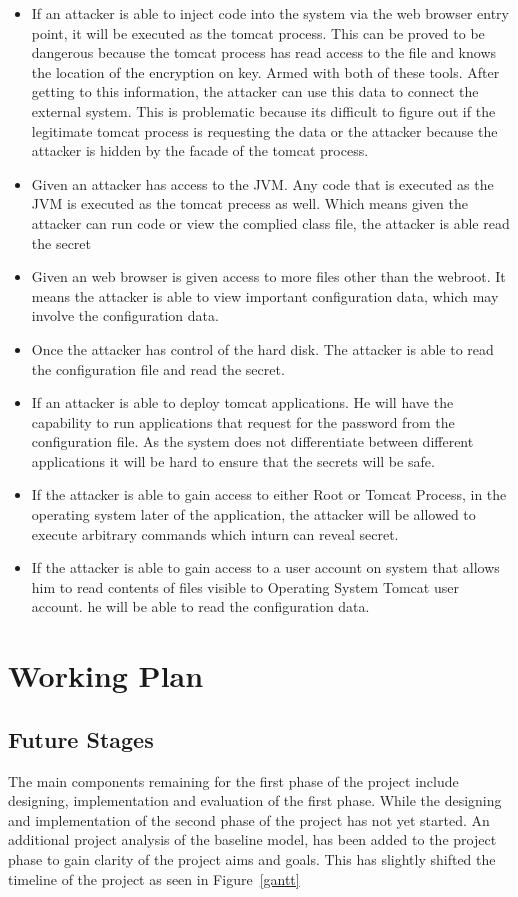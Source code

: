\documentclass[11pt, a4paper, notitlepage]{article}
\begin{document}
\begin{itemize}
\item If an attacker is able to inject code into the system via the web browser entry point, it will be executed as the tomcat process. This can be proved to be dangerous because the tomcat process has read access to the file and knows the location of the encryption on key. Armed with both of these tools. After getting to this information, the attacker can use this data to connect the external system. This is problematic because its difficult to figure out if the legitimate tomcat process is requesting the data or the attacker because the attacker is hidden by the facade of the tomcat process.
\item Given an attacker has access to the JVM. Any code that is executed as the JVM is executed as the tomcat precess as well. Which means given the attacker can run code or view the complied class file, the attacker is able read the secret
\item Given an web browser is given access to more files other than the webroot. It means the attacker is able to view important configuration data, which may involve the configuration data. 
\item Once the attacker has control of the hard disk. The attacker is able to read the configuration file and read the secret.
\item If an attacker is able to deploy tomcat applications. He will have the capability to run applications that request for the password from the configuration file. As the system does not differentiate between different applications it will be hard to ensure that the secrets will be safe.
\item If the attacker is able to gain access to either Root or Tomcat Process, in the operating system later of the application, the attacker will be allowed to execute arbitrary  commands which inturn can reveal secret.
\item If the attacker is able to gain access to a user account on system that allows him to read contents of files visible to Operating System Tomcat user account. he will be able to read the configuration data.
\end{itemize} 


\section{Working Plan}
\subsection*{Future Stages}
The main components remaining for the first phase of the project include designing, implementation and evaluation of the first phase. While the designing and implementation of the second phase of the project has not yet started. An additional project analysis of the baseline model, has been added to the project phase to gain clarity of the project aims and goals. This has slightly shifted the timeline of the project as seen in Figure~\ref{gantt}
\end{document}
